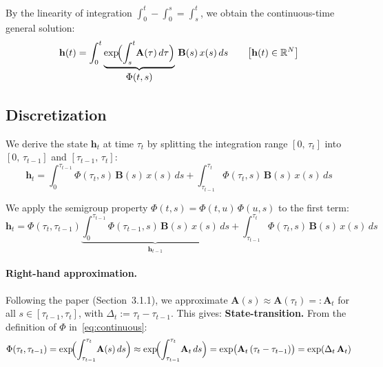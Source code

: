 \documentclass[11pt,a4paper]{article}
\begin{document}
By the linearity of integration $\int_{0}^{t} - \int_{0}^{s} = \int_{s}^{t}$, we obtain the continuous-time general solution:
\begin{equation}\label{eq:continuous}
  \mathbf{h}(t) = \int_{0}^{t}
  \underbrace{\exp\!\Bigl(\int_{s}^{t}\!\mathbf{A}(\tau)\,d\tau\Bigr)}_{\displaystyle\Phi(t,s)}
  \,\mathbf{B}(s)\,x(s)\,ds
  \qquad\bigl[\mathbf{h}(t)\in\mathbb{R}^{N}\bigr]
\end{equation}

\subsection{Discretization}

We derive the state $\mathbf{h}_t$ at time $\tau_t$ by splitting the integration range $[0,\,\tau_t]$ into $[0,\,\tau_{t-1}]$ and $[\tau_{t-1},\,\tau_t]$:
\begin{equation}
  \mathbf{h}_t = \int_{0}^{\tau_{t-1}}\!\Phi(\tau_t,s)\,\mathbf{B}(s)\,x(s)\,ds
           + \int_{\tau_{t-1}}^{\tau_t}\!\Phi(\tau_t,s)\,\mathbf{B}(s)\,x(s)\,ds
\end{equation}

We apply the semigroup property $\Phi(t,s)=\Phi(t,u)\,\Phi(u,s)$ to the first term:
\begin{equation}
  \mathbf{h}_t = \Phi(\tau_t,\tau_{t-1})
  \underbrace{\int_{0}^{\tau_{t-1}}\!\Phi(\tau_{t-1},s)\,\mathbf{B}(s)\,x(s)\,ds}_{\displaystyle \mathbf{h}_{t-1}}
  + \int_{\tau_{t-1}}^{\tau_t}\!\Phi(\tau_t,s)\,\mathbf{B}(s)\,x(s)\,ds
\end{equation}

\paragraph{Right-hand approximation.}\quad
Following the paper (Section~3.1.1), we approximate $\mathbf{A}(s) \approx \mathbf{A}(\tau_t) =: \mathbf{A}_t$ for all $s \in [\tau_{t-1},\tau_t]$, with $\Delta_t := \tau_t - \tau_{t-1}$. This gives:
\medskip\noindent\textbf{State-transition.}\quad
From the definition of $\Phi$ in~\eqref{eq:continuous}:
\begin{equation}
  \Phi(\tau_t,\tau_{t-1})
  = \exp\!\Bigl(\int_{\tau_{t-1}}^{\tau_t}\!\mathbf{A}(s)\,ds\Bigr)
  \approx \exp\!\Bigl(\int_{\tau_{t-1}}^{\tau_t}\!\mathbf{A}_t\,ds\Bigr)
  = \exp\bigl(\mathbf{A}_t\,(\tau_t - \tau_{t-1})\bigr)
  = \exp(\Delta_t\,\mathbf{A}_t)
\end{equation}
\end{document}
